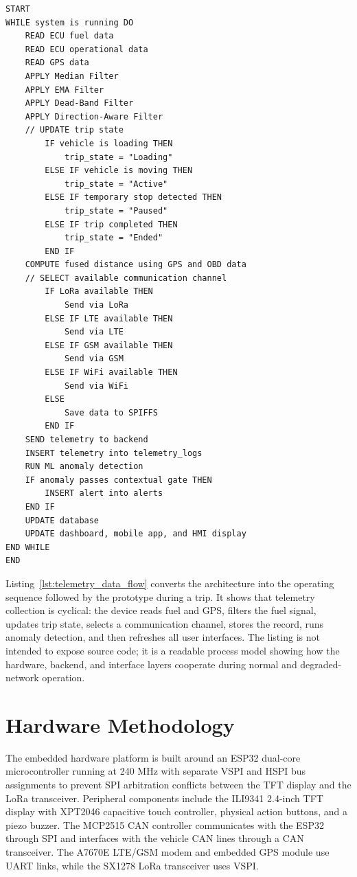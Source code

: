 \begin{lstlisting}[caption=End-to-End Telemetry Data Flow,label=lst:telemetry_data_flow]
START
WHILE system is running DO
    READ ECU fuel data
    READ ECU operational data
    READ GPS data
    APPLY Median Filter
    APPLY EMA Filter
    APPLY Dead-Band Filter
    APPLY Direction-Aware Filter
    // UPDATE trip state
        IF vehicle is loading THEN
            trip_state = "Loading"
        ELSE IF vehicle is moving THEN
            trip_state = "Active"
        ELSE IF temporary stop detected THEN
            trip_state = "Paused"
        ELSE IF trip completed THEN
            trip_state = "Ended"
        END IF
    COMPUTE fused distance using GPS and OBD data
    // SELECT available communication channel
        IF LoRa available THEN
            Send via LoRa
        ELSE IF LTE available THEN
            Send via LTE
        ELSE IF GSM available THEN
            Send via GSM
        ELSE IF WiFi available THEN
            Send via WiFi
        ELSE
            Save data to SPIFFS
        END IF
    SEND telemetry to backend
    INSERT telemetry into telemetry_logs
    RUN ML anomaly detection
    IF anomaly passes contextual gate THEN
        INSERT alert into alerts
    END IF
    UPDATE database
    UPDATE dashboard, mobile app, and HMI display
END WHILE
END
\end{lstlisting}

Listing~\ref{lst:telemetry_data_flow} converts the architecture into the operating sequence followed by the prototype during a trip. It shows that telemetry collection is cyclical: the device reads fuel and GPS, filters the fuel signal, updates trip state, selects a communication channel, stores the record, runs anomaly detection, and then refreshes all user interfaces. The listing is not intended to expose source code; it is a readable process model showing how the hardware, backend, and interface layers cooperate during normal and degraded-network operation.

\section{Hardware Methodology}
\label{sec:hardware}

The embedded hardware platform is built around an ESP32 dual-core microcontroller running at 240 MHz with separate VSPI and HSPI bus assignments to prevent SPI arbitration conflicts between the TFT display and the LoRa transceiver. Peripheral components include the ILI9341 2.4-inch TFT display with XPT2046 capacitive touch controller, physical action buttons, and a piezo buzzer. The MCP2515 CAN controller communicates with the ESP32 through SPI and interfaces with the vehicle CAN lines through a CAN transceiver.
The A7670E LTE/GSM modem and embedded GPS module use UART links, while the SX1278 LoRa transceiver uses VSPI.

